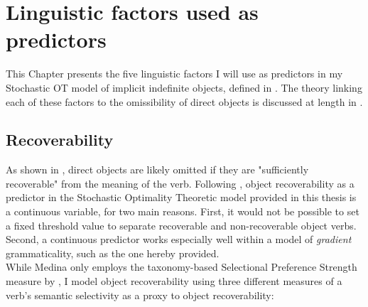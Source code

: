 \setchapterpreamble[u]{\margintoc}
\chapter{Linguistic factors used as predictors}

This Chapter presents the five linguistic factors I will use as predictors in my Stochastic OT model of implicit indefinite objects, defined in . The theory linking each of these factors to the omissibility of direct objects is discussed at length in .


\section{Recoverability} 



As shown in , direct objects are likely omitted if they are "sufficiently recoverable" \parencite{Glass2013} from the meaning of the verb. Following \textcite{Medina2007}, object recoverability as a predictor in the Stochastic Optimality Theoretic model provided in this thesis is a continuous variable, for two main reasons. First, it would not be possible to set a fixed threshold value to separate recoverable and non-recoverable object verbs. Second, a continuous predictor works especially well within a model of \textit{gradient} grammaticality, such as the one hereby provided.\\
While Medina only employs the taxonomy-based Selectional Preference Strength measure by \textcite{Resnik1993, Resnik1996}, I model object recoverability using three different measures of a verb's semantic selectivity as a proxy to object recoverability:

